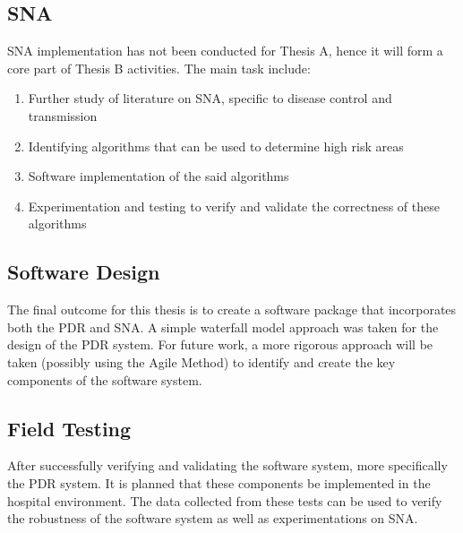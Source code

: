         \subsection{SNA}
        	SNA implementation has not been conducted for Thesis A, hence it will form a core part of Thesis B activities. The main task include:
            \begin{enumerate}
				\item Further study of literature on SNA, specific to disease control and transmission
                \item Identifying algorithms that can be used to determine high risk areas
                \item Software implementation of the said algorithms
                \item Experimentation and testing to verify and validate the correctness of these algorithms
			\end{enumerate}
        
        \subsection{Software Design}
        	The final outcome for this thesis is to create a software package that incorporates both the PDR and SNA. A simple waterfall model approach was taken for the design of the PDR system. For future work, a more rigorous approach will be taken (possibly using the Agile Method) to identify and create the key components of the software system. 
        
        \subsection{Field Testing}
        	After successfully verifying and validating the software system, more specifically the PDR system. It is planned that these components be implemented in the hospital environment. The data collected from these tests can be used to verify the robustness of the software system as well as experimentations on SNA.
        